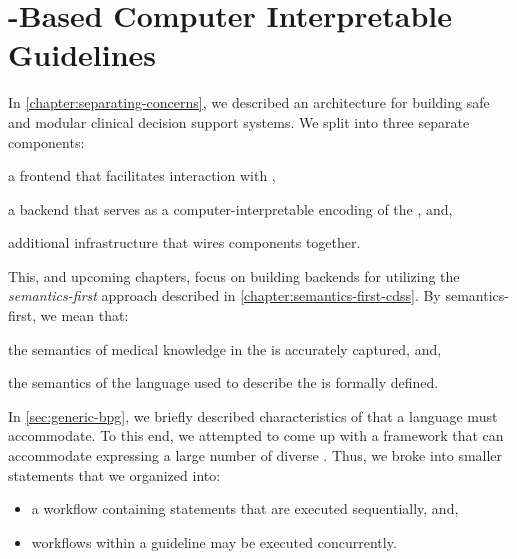 \chapter{\K{}-Based Computer Interpretable Guidelines}\label{chapter:k-based-guidelines}

In \autoref{chapter:separating-concerns}, we described an
architecture for building safe and modular clinical decision support systems.
We split \CDSSs{} into three separate components:
\begin{enumerate*}[label=(\alph*)]
  \item a frontend that facilitates interaction with \HCPs{},
  \item a backend that serves as a computer-interpretable encoding of the \BPG{}, and,
  \item additional infrastructure that wires components together.
\end{enumerate*}
This, and upcoming chapters, focus on building backends for \CDSSs{}
utilizing the \emph{semantics-first} approach described in
\autoref{chapter:semantics-first-cdss}. By semantics-first, we
mean that:
\begin{enumerate*}[label=(\alph*)]
 \item the semantics of medical knowledge in the \BPG{} is
 accurately captured, and,
 \item the semantics of the language used to describe the
 \BPG{} is formally defined.
\end{enumerate*}

In \autoref{sec:generic-bpg}, we briefly described characteristics
of \BPGs{} that a \CIG{} language must accommodate.
To this end, we attempted to come up with a framework that
can accommodate expressing a large number of diverse \BPGs{}.
Thus, we broke \BPGs{} into smaller statements that we organized
into:
\begin{itemize}
  \item a workflow containing statements that are executed sequentially, and,
  \item workflows within a guideline may be executed concurrently.
\end{itemize}

